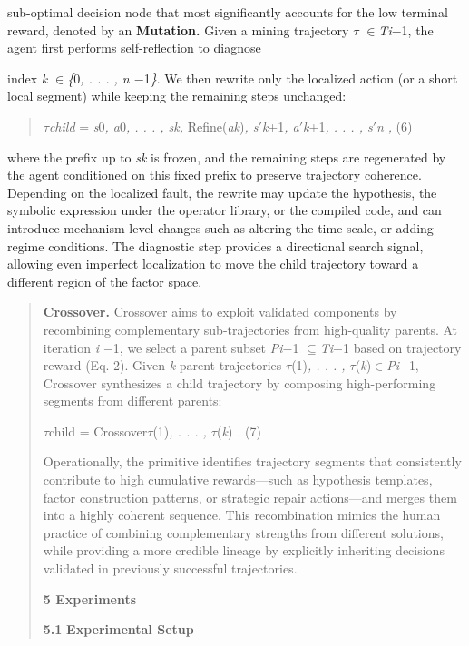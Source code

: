 \documentclass[
]{article}
\begin{document}
sub-optimal decision node that most significantly accounts for the low
terminal reward, denoted by an \textbf{Mutation.} Given a mining
trajectory \emph{$\tau$ $\in$Ti$-$}1, the agent first performs self-reflection to
diagnose

index \emph{k $\in$\{}0\emph{, . . . , n $-$}1\emph{\}}. We then rewrite only
the localized action (or a short local segment) while keeping the
remaining steps unchanged:

\begin{quote}
\emph{$\tau$child} = \emph{s}0\emph{, a}0\emph{, . . . , sk,}
Refine(\emph{ak})\emph{, s$'$k}+1\emph{, a$'$k}+1\emph{, . . . , s$'$n}
\emph{,} (6)
\end{quote}

where the prefix up to \emph{sk} is frozen, and the remaining steps are
regenerated by the agent conditioned on this fixed prefix to preserve
trajectory coherence. Depending on the localized fault, the rewrite may
update the hypothesis, the symbolic expression under the operator
library, or the compiled code, and can introduce mechanism-level changes
such as altering the time scale, or adding regime conditions. The
diagnostic step provides a directional search signal, allowing even
imperfect localization to move the child trajectory toward a different
region of the factor space.

\begin{quote}
\textbf{Crossover.} Crossover aims to exploit validated components by
recombining complementary sub-trajectories from high-quality parents. At
iteration \emph{i $-$}1, we select a parent subset \emph{Pi$-$}1
\emph{$\subseteq$Ti$-$}1 based on trajectory reward (Eq. 2). Given \emph{k} parent
trajectories \emph{$\tau$}(1)\emph{, . . . , $\tau$}(\emph{k})\emph{$\in$Pi$-$}1,
Crossover synthesizes a child trajectory by composing high-performing
segments from different parents:

\emph{$\tau$}child = Crossover\emph{$\tau$}(1)\emph{, . . . , $\tau$}(\emph{k})
\emph{.} (7)

Operationally, the primitive identifies trajectory segments that
consistently contribute to high cumulative rewards---such as hypothesis
templates, factor construction patterns, or strategic repair
actions---and merges them into a highly coherent sequence. This
recombination mimics the human practice of combining complementary
strengths from different solutions, while providing a more credible
lineage by explicitly inheriting decisions validated in previously
successful trajectories.

\textbf{5 Experiments}

\textbf{5.1} \textbf{Experimental Setup}
\end{quote}
\end{document}

